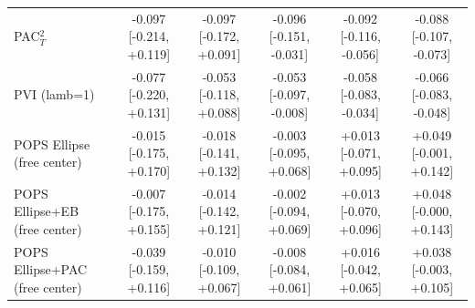 \begin{tabular}{lccccc}
PAC$^2_T$ & -0.097 {\scriptsize[-0.214, +0.119]} & -0.097 {\scriptsize[-0.172, +0.091]} & -0.096 {\scriptsize[-0.151, -0.031]} & -0.092 {\scriptsize[-0.116, -0.056]} & -0.088 {\scriptsize[-0.107, -0.073]} \\
PVI (lamb=1) & -0.077 {\scriptsize[-0.220, +0.131]} & -0.053 {\scriptsize[-0.118, +0.088]} & -0.053 {\scriptsize[-0.097, -0.008]} & -0.058 {\scriptsize[-0.083, -0.034]} & -0.066 {\scriptsize[-0.083, -0.048]} \\
POPS Ellipse (free center) & -0.015 {\scriptsize[-0.175, +0.170]} & -0.018 {\scriptsize[-0.141, +0.132]} & -0.003 {\scriptsize[-0.095, +0.068]} & +0.013 {\scriptsize[-0.071, +0.095]} & +0.049 {\scriptsize[-0.001, +0.142]} \\
POPS Ellipse+EB (free center) & -0.007 {\scriptsize[-0.175, +0.155]} & -0.014 {\scriptsize[-0.142, +0.121]} & -0.002 {\scriptsize[-0.094, +0.069]} & +0.013 {\scriptsize[-0.070, +0.096]} & +0.048 {\scriptsize[-0.000, +0.143]} \\
POPS Ellipse+PAC (free center) & -0.039 {\scriptsize[-0.159, +0.116]} & -0.010 {\scriptsize[-0.109, +0.067]} & -0.008 {\scriptsize[-0.084, +0.061]} & +0.016 {\scriptsize[-0.042, +0.065]} & +0.038 {\scriptsize[-0.003, +0.105]} \\
\bottomrule
\end{tabular}

